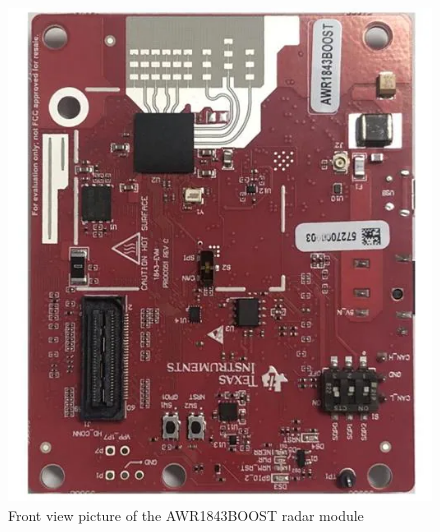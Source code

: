 \begin{figure}[H]
    \centering
    \begin{minipage}[b]{0.49\textwidth}
        \includegraphics[width=\textwidth]{Figures/AWR1843BOOST_DSL.png}
        \caption{Front view picture of the AWR1843BOOST radar module \cite{awr1843boostImage}}
        \label{fig:AWR1843BOOST_DSL}
    \end{minipage}
    \begin{minipage}[b]{0.49\textwidth}

\end{minipage}
\end{figure}

